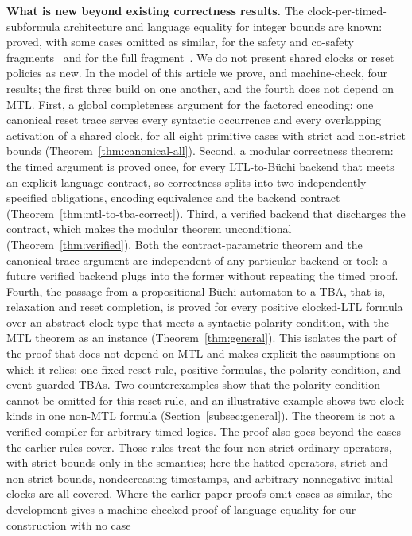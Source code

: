 \documentclass[manuscript]{acmart}
\newcommand{\runinhead}[1]{\par\noindent\textbf{#1}\enspace}
\begin{document}
\runinhead{What is new beyond existing correctness results.}
The clock-per-timed-subformula architecture and language equality for
integer bounds are known: proved, with some cases omitted as similar, for the safety and
co-safety fragments~\cite{BDLG14} and for the full fragment~\cite{li_spin7}. We do not present shared
clocks or reset policies as new. In the model of this article we prove, and
machine-check, four results; the first three build on one another, and the
fourth does not depend on MTL. First, a global completeness argument for the
factored encoding: one canonical reset trace serves every syntactic occurrence
and every overlapping activation of a shared clock, for all eight primitive
cases with strict and non-strict bounds
(Theorem~\ref{thm:canonical-all}). Second, a modular correctness theorem: the
timed argument is proved once, for every LTL-to-B\"uchi backend that meets an
explicit language contract, so correctness splits into two independently
specified obligations, encoding equivalence and the backend contract
(Theorem~\ref{thm:mtl-to-tba-correct}). Third, a verified backend that
discharges the contract, which makes the modular theorem unconditional
(Theorem~\ref{thm:verified}). Both the contract-parametric theorem and the
canonical-trace argument are independent of any particular backend or tool: a
future verified backend plugs into the former without repeating the timed proof.
Fourth, the passage from a propositional B\"uchi automaton to a TBA, that is,
relaxation and reset completion, is proved for every positive clocked-LTL
formula over an abstract clock type that meets a syntactic polarity condition,
with the MTL theorem as an instance (Theorem~\ref{thm:general}). This isolates
the part of the proof that does not depend on MTL and makes explicit the
assumptions on which it relies: one fixed reset rule, positive formulas, the
polarity condition, and event-guarded TBAs. Two counterexamples show that the
polarity condition cannot be omitted for this reset rule, and an illustrative
example shows two clock kinds in one non-MTL formula
(Section~\ref{subsec:general}). The theorem is not a verified compiler for
arbitrary timed logics.
The proof also goes beyond the cases the earlier rules cover. Those rules treat
the four non-strict ordinary operators, with strict bounds only in the
semantics; here the hatted operators, strict and non-strict bounds,
nondecreasing timestamps, and arbitrary nonnegative initial
clocks are all covered. Where the earlier paper proofs omit cases as similar, the development gives
a machine-checked proof of language equality for our construction with no case
\end{document}
